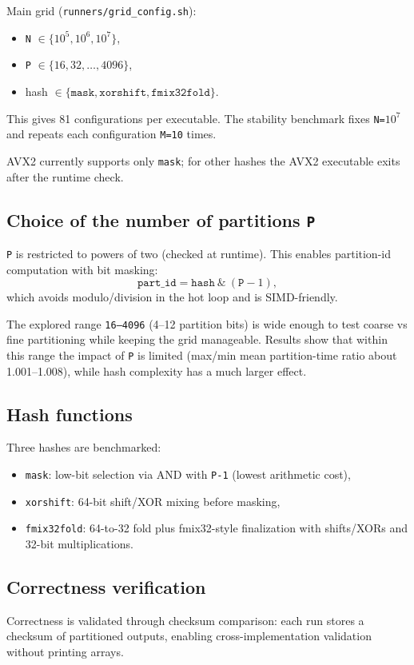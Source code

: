 \documentclass[11pt,a4paper]{article}
\begin{document}
Main grid (\texttt{runners/grid\_config.sh}):
\begin{itemize}
    \item \texttt{N} $\in \{10^5,10^6,10^7\}$,
    \item \texttt{P} $\in \{16,32,\ldots,4096\}$,
    \item hash $\in \{\texttt{mask}, \texttt{xorshift}, \texttt{fmix32fold}\}$.
\end{itemize}
This gives 81 configurations per executable. The stability benchmark fixes \texttt{N=$10^7$} and repeats each configuration \texttt{M=10} times.

AVX2 currently supports only \texttt{mask}; for other hashes the AVX2 executable exits after the runtime check.

\subsection{Choice of the number of partitions \texttt{P}}
\texttt{P} is restricted to powers of two (checked at runtime). This enables partition-id computation with bit masking:
\[
\texttt{part\_id} = \texttt{hash} \ \&\ (\texttt{P}-1),
\]
which avoids modulo/division in the hot loop and is SIMD-friendly.

The explored range \texttt{16--4096} (4--12 partition bits) is wide enough to test coarse vs fine partitioning while keeping the grid manageable. Results show that within this range the impact of \texttt{P} is limited (max/min mean partition-time ratio about 1.001--1.008), while hash complexity has a much larger effect.

\subsection{Hash functions}
Three hashes are benchmarked:
\begin{itemize}
    \item \texttt{mask}: low-bit selection via AND with \texttt{P-1} (lowest arithmetic cost),
    \item \texttt{xorshift}: 64-bit shift/XOR mixing before masking,
    \item \texttt{fmix32fold}: 64-to-32 fold plus fmix32-style finalization with shifts/XORs and 32-bit multiplications.
\end{itemize}

\subsection{Correctness verification}
Correctness is validated through checksum comparison: each run stores a checksum of partitioned outputs, enabling cross-implementation validation without printing arrays.
\end{document}
